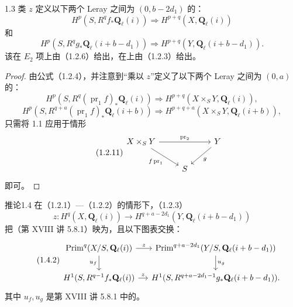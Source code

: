 \begin{SGAresult}{}{1.3}
类 $z$ 定义以下两个 Leray 之间为 $(0,b-2d_1)$ 的：
\begin{equation}\tag{1.2.7}
H^p(S,R^qf_*\mathbf Q_\ell(i))\Longrightarrow H^{p+q}(X,\mathbf Q_\ell(i))
\end{equation}
和
\begin{equation}\tag{1.2.8}
H^p(S,R^qg_*\mathbf Q_\ell(i+b-d_1))\Longrightarrow H^{p+q}(Y,\mathbf Q_\ell(i+b-d_1)).
\end{equation}
该在 $E_2$ 项上由（1.2.6）给出，在上由（1.2.3）给出。
\end{SGAresult}
\begin{proof}
由公式（1.2.4），并注意到“乘以 $z$”定义了以下两个 Leray 之间为 $(0,a)$ 的：
\begin{equation}\tag{1.2.9}
H^p(S,R^q(\operatorname{pr}_1 f)_*\mathbf Q_\ell(i))\Longrightarrow H^{p+q}(X\times_S Y,\mathbf Q_\ell(i)),
\end{equation}
\begin{equation}\tag{1.2.10}
H^p(S,R^{q+a}(\operatorname{pr}_1 f)_*\mathbf Q_\ell(i+b))\Longrightarrow H^{p+q+a}(X\times_S Y,\mathbf Q_\ell(i+b)),
\end{equation}
只需将 1.1 应用于情形
\begin{equation}\tag{1.2.11}
\begin{tikzcd}
X\times_S Y \arrow[rr,"\operatorname{pr}_2"] \arrow[dr,"f\operatorname{pr}_1"'] && Y \arrow[dl,"g"]\\
& S &
\end{tikzcd}
\end{equation}
即可。
\end{proof}
\begin{SGAresult}{推论}{1.4}
在（1.2.1）—（1.2.2）的情形下，（1.2.3）
\begin{equation}\tag{1.4.1}
z:H^q(X,\mathbf Q_\ell(i))\longrightarrow H^{q+a-2d_1}(Y,\mathbf Q_\ell(i+b-d_1))
\end{equation}
把（第 XVIII 讲 5.8.1）映为，且以下图表交换：
\begin{equation}\tag{1.4.2}
\begin{tikzcd}[column sep=small]
\operatorname{Prim}^q(X/S,\mathbf Q_\ell(i)) \arrow[r,"z"] \arrow[d,"u_f"'] & \operatorname{Prim}^{q+a-2d_1}(Y/S,\mathbf Q_\ell(i+b-d_1)) \arrow[d,"u_g"]\\
H^1(S,R^{q-1}f_*\mathbf Q_\ell(i)) \arrow[r,"z"] & H^1(S,R^{q+a-2d_1-1}g_*\mathbf Q_\ell(i+b-d_1)).
\end{tikzcd}
\end{equation}
其中 $u_f,u_g$ 是第 XVIII 讲 5.8.1 中的。
\end{SGAresult}
